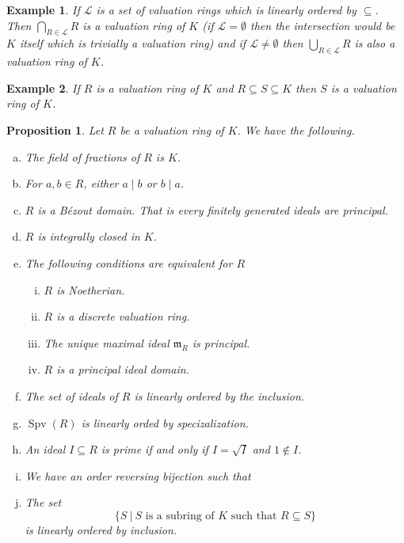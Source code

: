 \documentclass[8pt]{article}
\numberwithin{equation}{section}
\newtheorem{proposition}{Proposition}[subsection]
\newtheorem{example}{Example}[subsection]
\DeclareMathOperator{\Spec}{Spec}
\DeclareMathOperator{\Spv}{Spv}
\newcommand{\m}[0]{\mathfrak{m}}
\newcommand{\sep}[0]{\:|\:}
\newcommand{\p}[0]{\mathfrak{p}}
\newcommand{\tand}[0]{\text{ and }}
\begin{document}
\begin{example}
    If $\mathcal{L}$ is a set of valuation rings which is linearly ordered by $\subseteq$. Then $\bigcap_{R\in\mathcal{L}}R$ is a valuation ring of $K$ (if $\mathcal{L}=\emptyset$ then the intersection would be $K$ itself which is trivially a valuation ring) and if $\mathcal{L}\not=\emptyset$ then $\bigcup_{R\in\mathcal{L}}R$ is also a valuation ring of $K$.
\end{example}

\begin{example}
    If $R$ is a valuation ring of $K$ and $R\subseteq S\subseteq K$ then $S$ is a valuation ring of $K$.
\end{example}

\begin{proposition}Let $R$ be a valuation ring of $K$. We have the following.
    \label{fact_7_1}
    \begin{enumerate}[a.]
        \item The field of fractions of $R$ is $K$. 
        \item For $a,b\in R$, either $a\mid b$ or $b\mid a$. 
        \item $R$ is a Bézout domain. That is every finitely generated ideals are principal. 
        \item $R$ is integrally closed in $K$. 
        \item The following conditions are equivalent for $R$
        \begin{enumerate}[i.]
            \item $R$ is Noetherian.
            \item $R$ is a discrete valuation ring.
            \item The unique maximal ideal $\m_R$ is principal.
            \item $R$ is a principal ideal domain.
        \end{enumerate}
        \item The set of ideals of $R$ is linearly ordered by the inclusion.
        \item $\Spv(R)$ is linearly orded by specizalization.
        \item An ideal $I\subseteq R$ is prime if and only if $I=\sqrt{I}$ and $1\not\in I$.
        \item We have an order reversing bijection such that 
        \begin{center}
        \end{center}
        \item The set 
        \begin{equation*}
            \{S\sep \text{$S$ is a subring of $K$ such that $R\subseteq S$}\}
        \end{equation*}
        is linearly ordered by inclusion.
    \end{enumerate}
\end{proposition}
\end{document}
